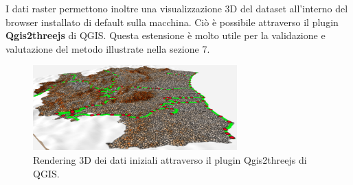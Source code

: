 I dati raster permettono inoltre una visualizzazione 3D del dataset all'interno del browser installato di default sulla macchina. Ciò è possibile attraverso il plugin \textbf{Qgis2threejs} di QGIS. Questa estensione è molto utile per la validazione e valutazione del metodo illustrate nella sezione 7.

\begin{figure}[h]
	\centering
	\includegraphics[width=0.7\textwidth]{images/Threejs}
	\caption{Rendering 3D dei dati iniziali attraverso il plugin Qgis2threejs di QGIS.}
	\label{threejs}
\end{figure}